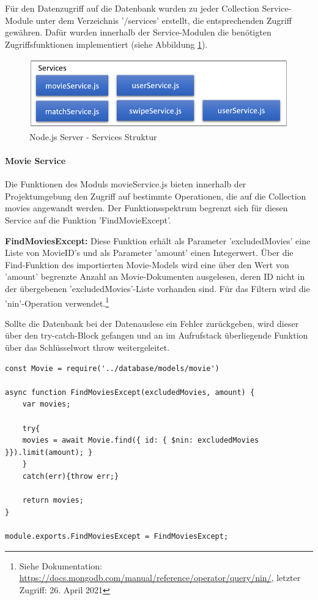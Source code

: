 Für den Datenzugriff auf die Datenbank wurden zu jeder Collection Service-Module unter dem Verzeichnis '/services' erstellt, die entsprechenden Zugriff gewähren. Dafür wurden innerhalb der Service-Modulen  die benötigten Zugriffsfunktionen implementiert (siehe Abbildung \ref{fig:node_service_structure}).

\begin{figure}[tbt]
\centering
\includegraphics[width=12cm]{images/serviceStruktur.PNG}
\caption{Node.js Server - Services Struktur}
\label{fig:node_service_structure}
\end{figure}


%
%

\paragraph{Movie Service}
Die Funktionen des Moduls movieService.js bieten innerhalb der Projektumgebung den Zugriff auf bestimmte Operationen, die  auf die Collection movies angewandt werden. Der Funktionsspektrum begrenzt sich für diesen Service auf die Funktion 'FindMovieExcept'.

\noindent
\textbf{FindMoviesExcept:}
Diese Funktion erhält als Parameter 'excludedMovies' eine Liste von MovieID's und als Parameter 'amount' einen Integerwert.
Über die Find-Funktion des importierten Movie-Models wird eine über den Wert von 'amount' begrenzte Anzahl an Movie-Dokumenten ausgelesen, deren ID nicht in der übergebenen 'excludedMovies'-Liste vorhanden sind. Für das Filtern wird die 'nin'-Operation verwendet.\footnote{Siehe Dokumentation: \url{https://docs.mongodb.com/manual/reference/operator/query/nin/}, letzter Zugriff: 26. April 2021}

Sollte die Datenbank bei der Datenauslese ein Fehler zurückgeben, wird dieser über den try-catch-Block gefangen und an im Aufrufstack überliegende Funktion über das Schlüsselwort throw weitergeleitet.\\

\begin{lstlisting}[caption=movieService.js - FindMoviesExcept, label=lst:findmoviesexcept]
const Movie = require('../database/models/movie')

async function FindMoviesExcept(excludedMovies, amount) {
    var movies;

    try{ 
    movies = await Movie.find({ id: { $nin: excludedMovies }}).limit(amount); }
    }
    catch(err){throw err;}

    return movies;
}

module.exports.FindMoviesExcept = FindMoviesExcept;
\end{lstlisting}


